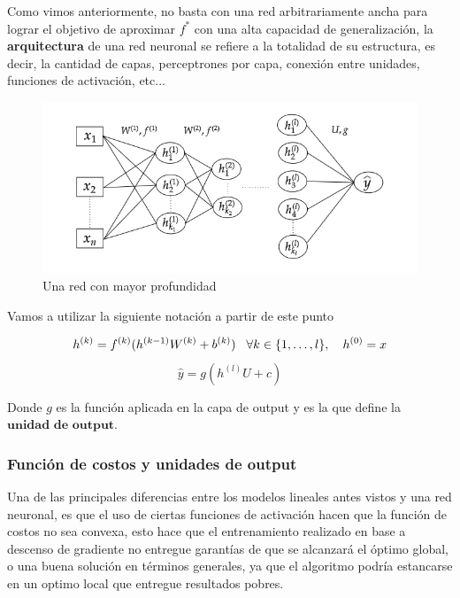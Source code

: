 Como vimos anteriormente, no basta con una red arbitrariamente ancha para lograr el objetivo de aproximar $f^{*}$ con una alta capacidad de generalización, la \textbf{arquitectura} de una red neuronal se refiere a la totalidad de su estructura, es decir, la cantidad de capas, perceptrones por capa, conexión entre unidades, funciones de activación, etc... 

\begin{figure}[H]
	\centering
	\includegraphics[scale=.5]{img/cap7_red}
	\caption{Una red con mayor profundidad}
\end{figure}

Vamos a utilizar la siguiente notación a partir de este punto 

\begin{equation}
	h^{(k)} = f^{(k)}(h^{(k-1)}W^{(k)} + b^{(k)}) \hspace{0.3cm} \forall k \in \{1 ,\dots, l\}, \quad h^{(0)}=x
	\end{equation}
	\begin{equation}
	\hat{y} = g(h^{(l)}U + c)
\end{equation}
	
Donde $g$ es la función aplicada en la capa de output y es la que define la $\textbf{unidad de output}.$

\subsubsection{Función de costos y unidades de output}

Una de las principales diferencias entre los modelos lineales antes vistos y una red neuronal, es que el uso de ciertas funciones de activaci\'on hacen que la funci\'on de costos no sea convexa, esto hace que el entrenamiento realizado en base a descenso de gradiente no entregue garant\'ias de que se alcanzar\'a el \'optimo global, o una buena solución en términos generales, ya que el algoritmo podría estancarse en un optimo local que entregue resultados pobres. 

